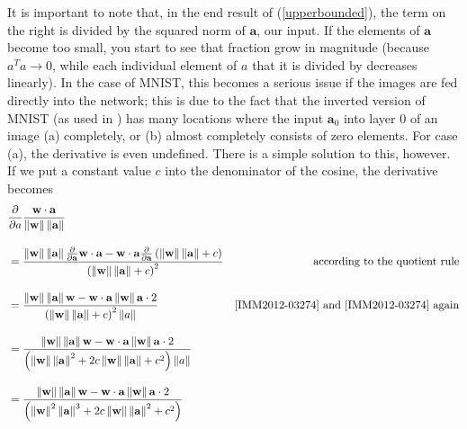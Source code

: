 It is important to note that, in the end result of (\ref{upperbounded}), the term on the right is
divided by the squared norm of $\mathbf{a}$, our input. If the elements of $\mathbf{a}$ become too
small, you start to see that fraction grow in magnitude (because $a^T a \to 0$, while each
individual element of $a$ that it is divided by decreases linearly). In the case of
MNIST\cite{lecun}, this becomes a serious issue if the images are fed directly into the network;
this is due to the fact that the inverted version of MNIST (as used in \cite{szegedy2014intriguing})
has many locations where the input $\mathbf{a}_0$ into layer $0$ of an image (a) completely, or (b)
almost completely consists of zero elements. For case (a), the derivative is even undefined. There
is a simple solution to this, however. If we put a constant value $c$ into the denominator of the
cosine, the derivative becomes
\begin{align*}
    &\frac{\partial}{\partial a} \frac{\mathbf{w} \cdot \mathbf{a}}{\left\| \mathbf{w} \right\| \left\| \mathbf{a} \right\|}\\[10pt]
    &= \frac{
        \left\| \mathbf{w} \right\| \left\| \mathbf{a} \right\| \frac{\partial }{\partial \mathbf{a}} \mathbf{w} \cdot \mathbf{a}     -    \mathbf{w} \cdot \mathbf{a} \frac{\partial }{\partial \mathbf{a}} \left( \left\| \mathbf{w} \right\| \left\| \mathbf{a} \right\| + c\right) 
    }{
        \left(   \left\| \mathbf{w} \right\| \left\| \mathbf{a} \right\|   +   c \right)^2
    } & \text{according to the quotient rule}\\[10pt]
    &= \frac{
        \left\| \mathbf{w} \right\|   \left\| \mathbf{a} \right\|   \mathbf{w}      -       \mathbf{w} \cdot \mathbf{a}   \left\| \mathbf{w} \right\|   \mathbf{a} \cdot 2
    }{
        \left(   \left\| \mathbf{w} \right\| \left\| \mathbf{a} \right\|   +   c    \right)^2   \left\| a \right\|
    } & \text{\cite[eqn. 69]{IMM2012-03274} and \cite[eqn. 131]{IMM2012-03274} again}\\[10pt]
    &= \frac{
        \left\| \mathbf{w} \right\|   \left\| \mathbf{a} \right\|   \mathbf{w}      -       \mathbf{w} \cdot \mathbf{a}   \left\| \mathbf{w} \right\|   \mathbf{a} \cdot 2
    }{
        \left(   \left\| \mathbf{w} \right\| \left\| \mathbf{a} \right\|^2   +   2c \left\| \mathbf{w} \right\| \left\| \mathbf{a} \right\|   +   c^2     \right)   \left\| a \right\|
    } \\[10pt]
    &= \frac{
        \left\| \mathbf{w} \right\|   \left\| \mathbf{a} \right\|   \mathbf{w}      -       \mathbf{w} \cdot \mathbf{a}   \left\| \mathbf{w} \right\|   \mathbf{a} \cdot 2
    }{
        \left(   \left\| \mathbf{w} \right\|^2 \left\| \mathbf{a} \right\|^3   +   2c \left\| \mathbf{w} \right\| \left\| \mathbf{a} \right\|^2   +   c^2     \right)
    }
\end{align*}
